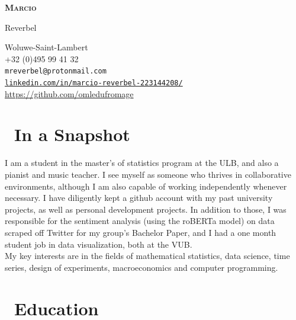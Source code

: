 \documentclass[12pt]{article}
\begin{document}
\begin{minipage}[t]{0.25\textwidth}
  {\sffamily\bfseries\scshape\huge
    Marcio
    
         \vspace{1ex}
     
    Reverbel}
\end{minipage}
\hfill
\begin{minipage}[t]{0.65\textwidth}
  \begin{small}
  \begin{flushright}
  Woluwe-Saint-Lambert\ \ \textcolor{Fuchsia}{\faHome\\}
  +32 (0)495 99 41 32\ \ \textcolor{Fuchsia}{\faPhone\\}
  \texttt{mreverbel@protonmail.com}\ \ \textcolor{Fuchsia}{\faEnvelope\\}
  \href{https://linkedin.com/in/marcio-reverbel-223144208/}{\texttt{linkedin.com/in/marcio-reverbel-223144208/}}\ \ \textcolor{Fuchsia}{\faLinkedin\\}
  \url{https://github.com/omledufromage}\ \ \textcolor{Fuchsia}{\faGithub\\}
  \end{flushright}
  \end{small}
\end{minipage}

\section*{\textcolor{Fuchsia}\faUser\ In a Snapshot}

I am a student in the master's of statistics program at the ULB, and also a pianist and music teacher. I see myself as someone who thrives in collaborative environments, although I am also capable of working independently whenever necessary. I have diligently kept a github account with my past university projects, as well as personal development projects. In addition to those, I was responsible for the sentiment analysis (using the roBERTa model) on data scraped off Twitter for my group's Bachelor Paper, and I had a one month student job in data visualization, both at the VUB. \\

My key interests are in the fields of mathematical statistics, data science, time series, design of experiments, macroeconomics and computer programming.

\section*{\textcolor{Fuchsia}\faGraduationCap\ Education}
\end{document}
